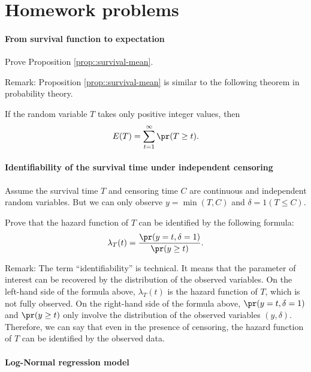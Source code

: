 \section{Homework problems}




\paragraph{From survival function to expectation}\label{hw23::survival-expectation}

Prove Proposition \ref{prop::survival-mean}. 


Remark: Proposition \ref{prop::survival-mean} is similar to the following theorem in probability theory.

\begin{theorem}
\label{thm::discrete-expection-survival}
If the random variable $T$ takes only positive integer values, then
$$
E(T) = \sum_{t=1}^{\infty} \pr(T \geq t).
$$
\end{theorem}




\paragraph{Identifiability of the survival time under independent censoring}\label{hw23::identification-km}

Assume the survival time $T$ and censoring time $C$ are continuous and independent random variables. But we can only observe $y = \min(T, C)$ and $\delta = 1(T \leq C)$. 

Prove that the hazard function of $T$ can be identified by the following formula: 
$$
\lambda_T(t) =    \frac{   \pr(y = t, \delta = 1)   }{  \pr(y \geq t)  } . 
$$ 


Remark: The term ``identifiability'' is technical. It means that the parameter of interest can be recovered by the distribution of the observed variables. On the left-hand side of the formula above, $\lambda_T(t)$ is the hazard function of $T$, which is not fully observed. On the right-hand side of the formula above, $\pr(y = t, \delta = 1) $ and $\pr(y \geq t) $ only involve the distribution of the observed variables $(y, \delta)$. Therefore, we can say that even in the presence of censoring, the hazard function of $T$ can be identified by the observed data. 
 
 

\paragraph{Log-Normal regression model}

